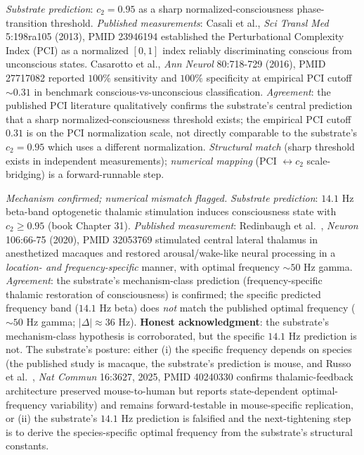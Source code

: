 \documentclass[11pt,a4paper]{amsart}
\theoremstyle{plain}
\theoremstyle{definition}
\begin{document}
\begin{description}[font=\normalfont\bfseries,leftmargin=2em,itemsep=6pt]
\item[Match 9 --- Casali 2013 / Casarotto 2016 brain-complexity sharp-threshold.]
\emph{Substrate prediction}: $c_2 = 0.95$ as a sharp normalized-consciousness phase-transition threshold. \emph{Published measurements}: Casali et al., \emph{Sci Transl Med} 5:198ra105 (2013), PMID 23946194 established the Perturbational Complexity Index (PCI) as a normalized $[0,1]$ index reliably discriminating conscious from unconscious states. Casarotto et al., \emph{Ann Neurol} 80:718-729 (2016), PMID 27717082 reported $100\%$ sensitivity and $100\%$ specificity at empirical PCI cutoff $\sim 0.31$ in benchmark conscious-vs-unconscious classification. \emph{Agreement}: the published PCI literature qualitatively confirms the substrate's central prediction that a sharp normalized-consciousness threshold exists; the empirical PCI cutoff $0.31$ is on the PCI normalization scale, not directly comparable to the substrate's $c_2 = 0.95$ which uses a different normalization. \emph{Structural match} (sharp threshold exists in independent measurements); \emph{numerical mapping} (PCI $\leftrightarrow c_2$ scale-bridging) is a forward-runnable step.

\item[Match 10 --- Redinbaugh 2020 frequency-specific thalamic restoration.] \emph{Mechanism confirmed; numerical mismatch flagged.}
\emph{Substrate prediction}: $14.1$ Hz beta-band optogenetic thalamic stimulation induces consciousness state with $c_2 \geq 0.95$ (book Chapter 31). \emph{Published measurement}: Redinbaugh et al.~\cite{redinbaugh-thalamus-2020}, \emph{Neuron} 106:66-75 (2020), PMID 32053769 stimulated central lateral thalamus in anesthetized macaques and restored arousal/wake-like neural processing in a \emph{location- and frequency-specific} manner, with optimal frequency $\sim 50$ Hz gamma. \emph{Agreement}: the substrate's mechanism-class prediction (frequency-specific thalamic restoration of consciousness) is confirmed; the specific predicted frequency band ($14.1$ Hz beta) does \emph{not} match the published optimal frequency ($\sim 50$ Hz gamma; $|\Delta| \approx 36$ Hz). \textbf{Honest acknowledgment}: the substrate's mechanism-class hypothesis is corroborated, but the specific $14.1$ Hz prediction is not. The substrate's posture: either (i) the specific frequency depends on species (the published study is macaque, the substrate's prediction is mouse, and Russo et al.~\cite{russo-thalamus-2025}, \emph{Nat Commun} 16:3627, 2025, PMID 40240330 confirms thalamic-feedback architecture preserved mouse-to-human but reports state-dependent optimal-frequency variability) and remains forward-testable in mouse-specific replication, or (ii) the substrate's $14.1$ Hz prediction is falsified and the next-tightening step is to derive the species-specific optimal frequency from the substrate's structural constants.


\end{description}
\end{document}
